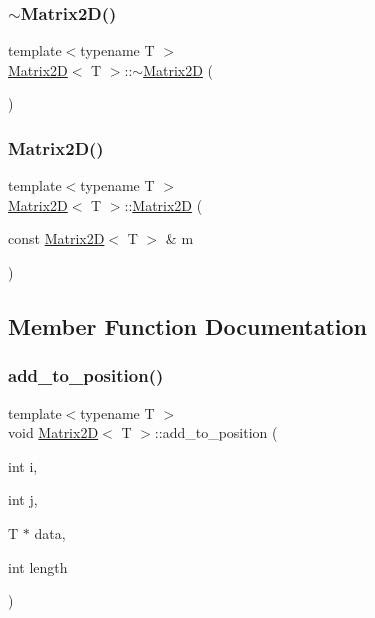 \mbox{\label{classMatrix2D_a6b86d001220161af2136ba49fd8b26b9}} 
\subsubsection{\texorpdfstring{$\sim$\+Matrix2\+D()}{~Matrix2D()}}
{\footnotesize\ttfamily template$<$typename T $>$ \\
\mbox{\hyperlink{classMatrix2D}{Matrix2D}}$<$ T $>$\+::$\sim$\mbox{\hyperlink{classMatrix2D}{Matrix2D}} (\begin{DoxyParamCaption}{ }\end{DoxyParamCaption})}

\mbox{\label{classMatrix2D_aa1d3642d7cea07adac1a7bd83586d292}} 
\subsubsection{\texorpdfstring{Matrix2\+D()}{Matrix2D()}\hspace{0.1cm}{\footnotesize\ttfamily [3/3]}}
{\footnotesize\ttfamily template$<$typename T $>$ \\
\mbox{\hyperlink{classMatrix2D}{Matrix2D}}$<$ T $>$\+::\mbox{\hyperlink{classMatrix2D}{Matrix2D}} (\begin{DoxyParamCaption}\item[{const \mbox{\hyperlink{classMatrix2D}{Matrix2D}}$<$ T $>$ \&}]{m }\end{DoxyParamCaption})}



\subsection{Member Function Documentation}
\mbox{\label{classMatrix2D_a2bd34bc1808af36aa3dce5af143ce304}} 
\subsubsection{\texorpdfstring{add\+\_\+to\+\_\+position()}{add\_to\_position()}}
{\footnotesize\ttfamily template$<$typename T $>$ \\
void \mbox{\hyperlink{classMatrix2D}{Matrix2D}}$<$ T $>$\+::add\+\_\+to\+\_\+position (\begin{DoxyParamCaption}\item[{int}]{i,  }\item[{int}]{j,  }\item[{T $\ast$}]{data,  }\item[{int}]{length }\end{DoxyParamCaption})}

